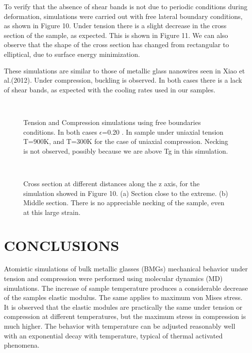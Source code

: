 To verify that the absence of shear bands is not due to periodic conditions during deformation, simulations were carried out with free lateral boundary conditions, as shown in Figure 10. Under tension there is a slight decrease in the cross section of the sample, as expected. This is shown in Figure 11. We can also observe that the shape of the cross section has changed from rectangular to elliptical, due to surface energy minimization.

These simulations are similar to those of metallic glass nanowires seen in Xiao et al.(2012). Under compression, buckling is observed. In both cases there is a lack of shear bands, as expected with the cooling rates used in our samples.

\begin{figure}[htp]
\centering
{}
\\
\caption{Tension and Compression simulations using free boundaries conditions. In both cases $\epsilon$=0.20 . In sample under uniaxial tension T=900K, and T=300K for the case of uniaxial compression. Necking is not observed, possibly because we are above Tg in this simulation.}
\label{C3:fg:libres}
\end{figure}

\begin{figure}[htp]
\centering
{}
\\
\caption{Cross section at different distances along the z axis, for the simulation showed in Figure 10. (a) Section close to the extreme. (b) Middle section. There is no appreciable necking of the sample, even at this large strain.}
\label{C3:fg:cross}
\end{figure}

\section{CONCLUSIONS}
Atomistic simulations of bulk metallic glasses (BMGs) mechanical behavior under tension and compression were performed using molecular dynamics (MD) simulations. The increase of sample temperature produces a considerable decrease of the samples elastic modulus. The same applies to maximum von Mises stress. It is observed that the elastic modules are practically the same under tension or compression at different temperatures, but the maximum stress in compression is much higher. The behavior with temperature can be adjusted reasonably well with an exponential decay with temperature, typical of thermal activated phenomena.

